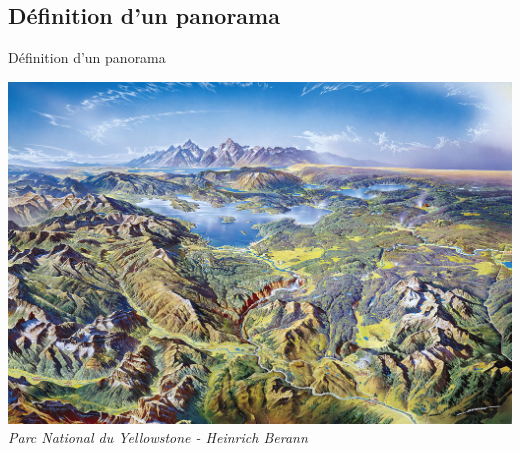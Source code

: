 \documentclass{beamer}
\begin{document}
\subsection*{Définition d'un panorama}
\begin{frame}{Définition d'un panorama}
\begin{center}
\includegraphics[width=.8\textwidth]{Images/yellowstone_small.jpg}\\
\textit{Parc National du Yellowstone - Heinrich Berann}
\end{center}





\end{frame}
\end{document}
